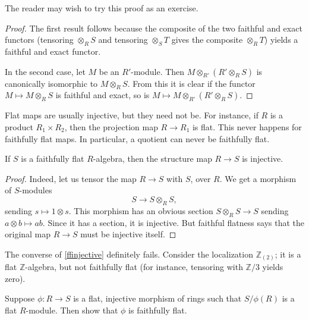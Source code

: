 The reader may wish to try this proof as an exercise.
\begin{proof} 
The first result follows because the composite of the two faithful and exact
functors (tensoring  $ \otimes_R S$ and tensoring  $ \otimes_S T$ gives the
composite $\otimes_R T$) yields a faithful and exact functor. 

In the second case, let $M$ be an $R'$-module. Then $M \otimes_{R'} (R'
\otimes_R S)$ is canonically isomorphic to $M \otimes_R S$. From this it is
clear if the functor $M \mapsto M \otimes_R S$ is faithful and
exact, so is 
$M \mapsto M \otimes_{R'} (R'
\otimes_R S)$.
\end{proof} 

Flat maps are usually injective, but they need not be. For instance, if $R$ is a
product $R_1 \times R_2$, then the projection map $R \to R_1$ is flat.
This never happens for faithfully flat maps.
In particular, a quotient can never be faithfully flat.

\begin{proposition}  \label{ffinjective}
If $S$ is a faithfully flat $R$-algebra, then the structure map $R \to S$ is injective.
\end{proposition} 
\begin{proof} 
Indeed, let us tensor the map $R \to S $ with $S$, over $R$. We get a morphism
of $S$-modules
\[ S \to S \otimes_R S ,  \]
sending $s \mapsto  1 \otimes s$.
This morphism has an obvious section $S \otimes_R S \to S$ sending $a \otimes b
\mapsto ab$. Since it has a section, it is injective. But faithful flatness says
that the original map $R \to S$ must be injective itself.
\end{proof} 

\begin{example} 
The converse of \cref{ffinjective} definitely fails. Consider the localization $\mathbb{Z}_{(2)}$;
it is a flat $\mathbb{Z}$-algebra, but not faithfully flat (for instance,
tensoring with $\mathbb{Z}/3$ yields zero).
\end{example} 

\begin{exercise} 
Suppose $\phi: R \to S$ is a flat, injective morphism of rings such that $S/\phi(R)$ is a
flat $R$-module. Then show that $\phi$ is faithfully flat. 
\end{exercise} 

